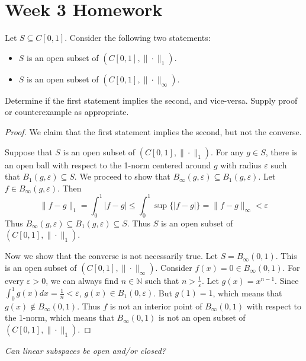 \documentclass{article}
\theoremstyle{plain} %
\numberwithin{thm}{section} %
\theoremstyle{definition}
\begin{document}
\section{Week 3 Homework}
    \exercise Let $S\subseteq C[0,1]$. Consider the following two statements:
    \begin{itemize}
        \item $S$ is an open subset of $(C[0,1],\|\cdot\|_1)$.
        \item $S$ is an open subset of $(C[0,1],\|\cdot\|_\infty)$.
    \end{itemize}
    Determine if the first statement implies the second, and vice-versa. Supply proof or counterexample as appropriate.

    \begin{proof}
        We claim that the first statement implies the second, but not the converse.

        Suppose that \(S\) is an open subset of \((C[0,1], \|\cdot\|_1)\). For any \(g \in S\), there is an open ball with respect to the 1-norm centered around \(g\) with radius \(\varepsilon\) such that \(B_1 (g, \varepsilon)\subseteq S\). We proceed to show that \(B_\infty (g, \varepsilon) \subseteq B_1 (g, \varepsilon)\). Let \(f \in B_\infty (g, \varepsilon)\). Then
        \[
            \|f-g\| _1 = \int _0^1 \left\vert f-g \right\vert \leq \int _0^1 \sup \{ \left\vert f-g \right\vert \} = \|f-g\| _\infty < \varepsilon 
        \]
        Thus \(B_\infty (g, \varepsilon) \subseteq B_1 (g, \varepsilon) \subseteq S\). Thus \(S\) is an open subset of \((C[0,1], \|\cdot \| _1)\).

        Now we show that the converse is not necessarily true. Let \(S = B_\infty (0, 1)\). This is an open subset of \((C[0,1],\|\cdot\|_\infty)\). Consider \(f(x) = 0 \in B_\infty (0, 1)\). For every \(\varepsilon > 0\), we can always find \(n \in \mathbb{N}\) such that \(n > \frac{1}{\varepsilon}\). Let \(g(x) = x^{n-1}\). Since \(\int _0^1 g(x)dx = \frac{1}{n} < \varepsilon\), \(g(x) \in B_1(0, \varepsilon)\). But \(g(1) = 1\), which means that \(g(x) \notin B_\infty (0, 1)\). Thus \(f\) is not an interior point of \(B_\infty (0, 1)\) with respect to the 1-norm, which means that \(B_\infty (0, 1)\) is not an open subset of \((C[0,1],\|\cdot\|_1)\).
        
    \end{proof}
    \exercise\textit{Can linear subspaces be open and/or closed?}
\end{document}
